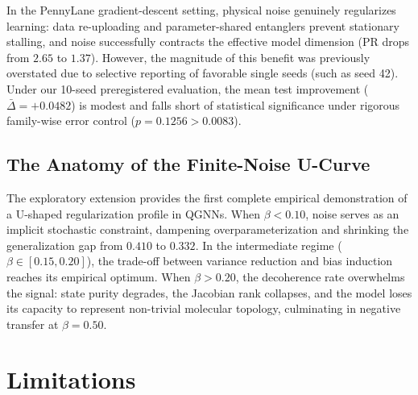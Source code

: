 \documentclass[sn-apacite,Numbered]{sn-jnl}
\begin{document}
In the PennyLane gradient-descent setting, physical noise genuinely regularizes learning: data re-uploading and parameter-shared entanglers prevent stationary stalling, and noise successfully contracts the effective model dimension (PR drops from $2.65$ to $1.37$). However, the magnitude of this benefit was previously overstated due to selective reporting of favorable single seeds (such as seed 42). Under our 10-seed preregistered evaluation, the mean test improvement ($\bar{\Delta} = +0.0482$) is modest and falls short of statistical significance under rigorous family-wise error control ($p = 0.1256 > 0.0083$).

\subsection{The Anatomy of the Finite-Noise U-Curve}
The exploratory extension provides the first complete empirical demonstration of a U-shaped regularization profile in QGNNs. When $\beta < 0.10$, noise serves as an implicit stochastic constraint, dampening overparameterization and shrinking the generalization gap from $0.410$ to $0.332$. In the intermediate regime ($\beta \in [0.15, 0.20]$), the trade-off between variance reduction and bias induction reaches its empirical optimum. When $\beta > 0.20$, the decoherence rate overwhelms the signal: state purity degrades, the Jacobian rank collapses, and the model loses its capacity to represent non-trivial molecular topology, culminating in negative transfer at $\beta = 0.50$.

\section{Limitations}\label{sec:limitations}
\end{document}
